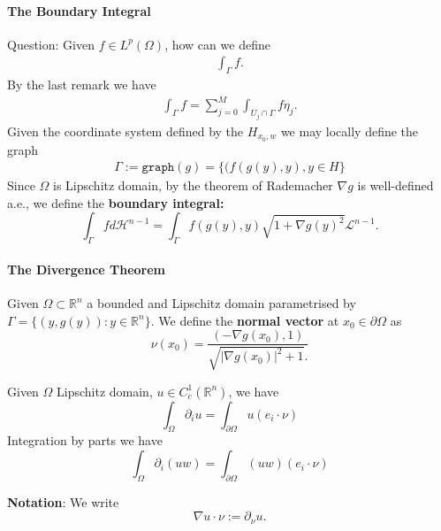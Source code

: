 \paragraph{The Boundary Integral}
Question: Given $f \in L^p(\Omega)$, how can we define 
\begin{align*}
	\int_\Gamma f.
\end{align*}
By the last remark we have
\begin{align*}
	\int_\Gamma f  = \sum_{j = 0}^M \int_{U_j\cap \Gamma} f\eta_j.
\end{align*}
Given the coordinate system defined by the $H_{x_0, w}$ we may locally define the graph
\begin{align*}
	\Gamma := \texttt{graph}(g) = \{(f(g(y), y), y \in H\}
\end{align*}  
Since $\Omega$ is Lipschitz domain, by the theorem of Rademacher $\nabla g$ is well-defined a.e.,  we define the \textbf{boundary integral:}
\begin{equation}
	\int_\Gamma f d\mathcal{H}^{n -1} = \int_\Gamma f(g(y), y) \sqrt{1 + \nabla g(y)^2} \mathcal{L}^{n -1}. 
\end{equation}


\paragraph{The Divergence Theorem}
\begin{definition}
	Given $\Omega \subset \mathbb{R}^n$ a bounded and Lipschitz domain parametrised by $\Gamma = \{(y, g(y)): y \in \mathbb{R}^n \}$. We define the \textbf{normal vector} at $x_0 \in \partial\Omega$ as 
	\begin{equation}
		\nu(x_0) = \frac{(- \nabla g(x_0), 1) }{\sqrt{|\nabla g(x_0)|^2 + 1}.}
	\end{equation}
\end{definition}

\begin{theorem}
	Given $\Omega$ Lipschitz domain, $u \in C^1_c(\mathbb{R}^n)$,  we have
	\begin{equation}
		\int_\Omega \partial_i u  = \int_{\partial\Omega} u(e_i \cdot \nu)
	\end{equation}
	Integration by parts we have
	\begin{equation}
		\int_\Omega \partial_i(uw) = \int_{\partial\Omega} (uw)(e_i \cdot \nu)
	\end{equation}
\end{theorem}
\begin{remark}
\textbf{Notation}: We write 
\begin{equation}
	\nabla u \cdot \nu := \partial_\nu u. 
\end{equation}	
\end{remark}




